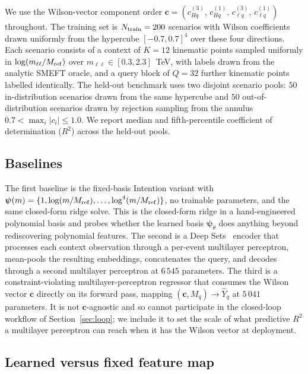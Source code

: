 \documentclass[11pt,a4paper]{article}
\newcommand{\mll}{m_{\ell\ell}}
\newcommand{\psib}{\bm{\psi}}
\newcommand{\Mref}{M_{\rm ref}}
\begin{document}
We use the Wilson-vector component order $\bm{c} = (c_{Hq}^{(3)},\,c_{Hq}^{(1)},\,c_{\ell q}^{(3)},\,c_{\ell q}^{(1)})$ throughout. The training set is $N_{\rm train} = 200$ scenarios with Wilson coefficients drawn uniformly from the hypercube $[-0.7, 0.7]^4$ over these four directions. Each scenario consists of a context of $K = 12$ kinematic points sampled uniformly in $\log(\mll/\Mref)$ over $\mll \in [0.3, 2.3]$~TeV, with labels drawn from the analytic SMEFT oracle, and a query block of $Q = 32$ further kinematic points labelled identically. The held-out benchmark uses two disjoint scenario pools: $50$ in-distribution scenarios drawn from the same hypercube and $50$ out-of-distribution scenarios drawn by rejection sampling from the annulus $0.7 < \max_i |c_i| \leq 1.0$. We report median and fifth-percentile coefficient of determination ($R^2$) across the held-out pools.

\subsection{Baselines}

The first baseline is the fixed-basis Intention variant with $\psib(m) = \{1, \log(m/\Mref), \ldots, \log^4(m/\Mref)\}$, no trainable parameters, and the same closed-form ridge solve. This is the closed-form ridge in a hand-engineered polynomial basis and probes whether the learned basis $\psib_\theta$ does anything beyond rediscovering polynomial features. The second is a Deep Sets~\cite{Zaheer:2017deepsets,Heinrich:2024mpm} encoder that processes each context observation through a per-event multilayer perceptron, mean-pools the resulting embeddings, concatenates the query, and decodes through a second multilayer perceptron at $6\,545$ parameters. The third is a constraint-violating multilayer-perceptron regressor that consumes the Wilson vector $\bm{c}$ directly on its forward pass, mapping $(\bm{c}, M_q) \to \hat{Y}_q$ at $5\,041$ parameters. It is not $\bm{c}$-agnostic and so cannot participate in the closed-loop workflow of Section~\ref{sec:loop}; we include it to set the scale of what predictive $R^2$ a multilayer perceptron can reach when it has the Wilson vector at deployment.

\subsection{Learned versus fixed feature map}
\label{sec:headline}
\end{document}
